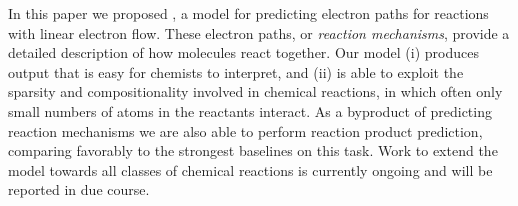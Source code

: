 
In this paper we proposed \ourModel, a model for predicting electron paths for reactions with linear electron flow.
These electron paths, or {\em reaction mechanisms}, provide a detailed description of how molecules react together. 
Our model (i) produces output that is easy for chemists to interpret, and (ii) is able to exploit the sparsity and compositionality involved in chemical reactions, in which often only small numbers of atoms in the reactants interact.
As a byproduct of predicting reaction mechanisms we are also able to perform reaction product prediction,
comparing favorably to the strongest baselines on this task. 
 Work to extend the model towards all classes of chemical reactions is currently ongoing and will be reported in due course.
%
%
%
%
%

